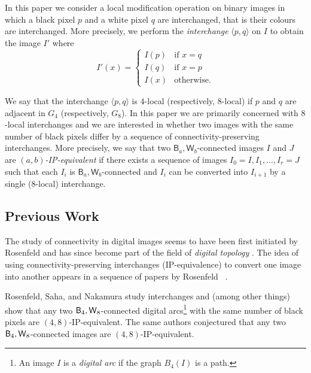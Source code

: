 \documentclass[lotsofwhite,charterfonts]{patmorin}
\newcommand{\foureight}{\ensuremath{\protect\textup{\textsf{B}}_{4},\protect\textup{\textsf{W}}_{8}}}
\newcommand{\ic}[2]{\langle #1,#2 \rangle}
\begin{document}
In this paper we consider a local modification operation on binary
images in which a black pixel $p$ and a white pixel $q$ are
interchanged, that is their colours are interchanged.  More precisely, we perform the \emph{interchange}
$\ic{p}{q}$ on $I$ to obtain the image $I'$ where
\[
     I'(x) = \left\{\begin{array}{ll}
         I(p) & \mbox{if $x=q$} \\
         I(q) & \mbox{if $x=p$} \\
         I(x) & \mbox{otherwise.}\end{array}\right.
\]

We say that the interchange $\ic{p}{q}$ is $4$-local (respectively,
$8$-local) if $p$ and $q$ are adjacent in $G_4$ (respectively, $G_8$).
In this paper we are primarily concerned with $8$-local interchanges
and we are interested in whether two images with the same number of
black pixels differ by a sequence of connectivity-preserving
interchanges.  More precisely, we say that two $\textsf{B}_a,\textsf{W}_b$-connected images $I$ and $J$ are \emph{$(a,b)$-IP-equivalent}
\cite{rn02} if there exists a sequence of images $I_0=I,I_1,\ldots,I_r=J$ such that each $I_i$ is $\textsf{B}_a,\textsf{W}_b$-connected and $I_{i}$ can be converted into $I_{i+1}$ by a single (8-local) interchange.

\subsection{Previous Work}

The study of connectivity in digital images seems to have been first
initiated by Rosenfeld \cite{r70,r73,r74} and has since become part of
the field of \emph{digital topology} \cite{hr96,kr89}.  The idea of
using connectivity-preserving interchanges (IP-equivalence) to convert
one image into another appears in a sequence of papers by Rosenfeld
\etal\ \cite{rkn98,rn02,rsn01}.

Rosenfeld, Saha, and Nakamura \cite{rsn01} study interchanges and
(among other things) show that any two \foureight-connected digital
arcs\footnote{An image $I$ is a \emph{digital arc} if the graph
$B_4(I)$ is a path.} with the same number of black pixels are
$(4,8)$-IP-equivalent. The same authors conjectured that any two
\foureight-connected images are $(4,8)$-IP-equivalent.
\end{document}
